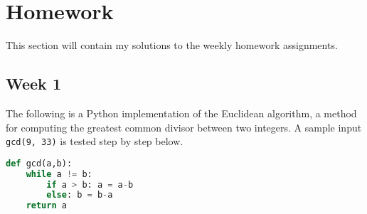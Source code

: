 \documentclass{article}
\theoremstyle{theorem}
\theoremstyle{definition}
\theoremstyle{remark}
\begin{document}
\section{Homework}\label{homework}

This section will contain my solutions to the weekly homework assignments. 

\subsection{Week 1}

The following is a Python implementation of the Euclidean algorithm, a method for computing the greatest common divisor between two integers. A sample input \texttt{gcd(9, 33)} is tested step by step below.

\begin{lstlisting}[language=Python]
def gcd(a,b):
    while a != b:
        if a > b: a = a-b
        else: b = b-a
    return a
\end{lstlisting}
\end{document}
